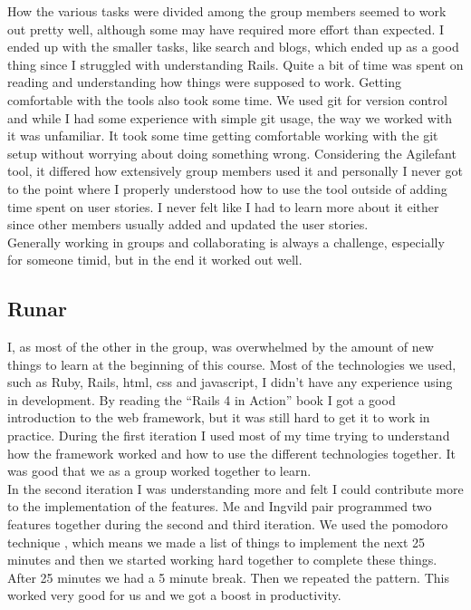 \documentclass[a4paper]{article}
\begin{document}
\noindent
How the various tasks were divided among the group members seemed to work out pretty well, although some may have required more effort than expected. I ended up with the smaller tasks, like search and blogs, which ended up as a good thing since I struggled with understanding Rails. Quite a bit of time was spent on reading and understanding how things were supposed to work. Getting comfortable with the tools also took some time. We used git for version control and while I had some experience with simple git usage, the way we worked with it was unfamiliar. It took some time getting comfortable working with the git setup without worrying about doing something wrong. Considering the Agilefant tool, it differed how extensively group members used it and personally I never got to the point where I properly understood how to use the tool outside of adding time spent on user stories. I never felt like I had to learn more about it either since other members usually added and updated the user stories.\\

\noindent
Generally working in groups and collaborating is always a challenge, especially for someone timid, but in the end it worked out well.

\subsection{Runar}
I, as most of the other in the group, was overwhelmed by the amount of new things to learn at the beginning of this course. Most of the technologies we used, such as Ruby, Rails, html, css and javascript, I didn't have any experience using in development. By reading the ``Rails 4 in Action'' book \cite{railsaction} I got a good introduction to the web framework, but it was still hard to get it to work in practice. During the first iteration I used most of my time trying to understand how the framework worked and how to use the different technologies together. It was good that we as a group worked together to learn. \\

\noindent
In the second iteration I was understanding more and felt I could contribute more to the implementation of the features. Me and Ingvild pair programmed two features together during the second and third iteration. We used the pomodoro technique \cite{pomodoro}, which means we made a list of things to implement the next 25 minutes and then we started working hard together to complete these things. After 25 minutes we had a 5 minute break. Then we repeated the pattern. This worked very good for us and we got a boost in productivity.
\end{document}
